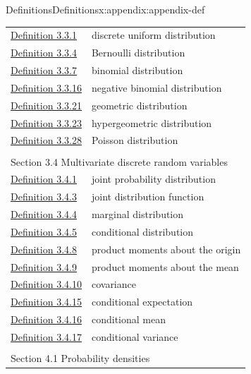 \documentclass[oneside,10pt,]{book}
\begin{document}
\begin{appendixptx}{Definitions}{}{Definitions}{}{}{x:appendix:appendix-def}
\begin{longtable}[l]{ll}
\hyperref[x:definition:def-discrete-unif]{Definition 3.3.1}& discrete uniform distribution\\
\hyperref[x:definition:def-bern]{Definition 3.3.4}& Bernoulli distribution\\
\hyperref[x:definition:def-bin]{Definition 3.3.7}& binomial distribution\\
\hyperref[x:definition:def-neg-bin]{Definition 3.3.16}& negative binomial distribution\\
\hyperref[x:definition:def-geom]{Definition 3.3.21}& geometric distribution\\
\hyperref[x:definition:def-hyper]{Definition 3.3.23}& hypergeometric distribution\\
\hyperref[x:definition:def-poiss]{Definition 3.3.28}& Poisson distribution\\
\multicolumn{2}{l}{\null}\\[1.5ex] \multicolumn{2}{l}{\large Section 3.4 Multivariate discrete random variables}\\[0.5ex]
\hyperref[x:definition:def-joint-probability-distribution-3-6]{Definition 3.4.1}& joint probability distribution\\
\hyperref[x:definition:def-joint-distribution-function-3-7]{Definition 3.4.3}& joint distribution function\\
\hyperref[x:definition:def-marginal-distribution-3-10]{Definition 3.4.4}& marginal distribution\\
\hyperref[x:definition:def-conditional-distribution-3-10]{Definition 3.4.5}& conditional distribution\\
\hyperref[x:definition:def-product-moments-origin-4-7]{Definition 3.4.8}& product moments about the origin\\
\hyperref[x:definition:def-product-moments-mean-4-8]{Definition 3.4.9}& product moments about the mean\\
\hyperref[x:definition:def-covariance-4-9]{Definition 3.4.10}& covariance\\
\hyperref[x:definition:def-conditional-expectation-4-10]{Definition 3.4.15}& conditional expectation\\
\hyperref[x:definition:def-conditional-mean]{Definition 3.4.16}& conditional mean\\
\hyperref[x:definition:def-conditional-variance]{Definition 3.4.17}& conditional variance\\
\multicolumn{2}{l}{\null}\\[1.5ex] \multicolumn{2}{l}{\large Section 4.1 Probability densities}\\[0.5ex]

\end{longtable}
\end{appendixptx}
\end{document}
